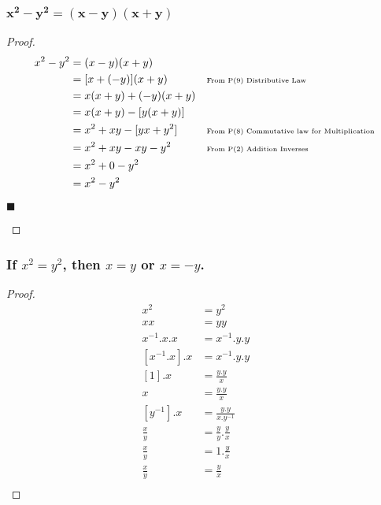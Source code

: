 \documentclass[letterpaper, 10 pt, conference]{ieeeconf}  %
\begin{document}
\subsubsection{$\boldsymbol{x^2 - y^2 = (x - y)(x + y)}$}

\begin{proof}
\begin{align}
     x^2 - y^2&= (x - y)(x + y) && \\
     &=[x + (-y)](x + y) && \text{\tiny{From P(9) Distributive Law}} \\ 
     &=x(x + y) + (-y)(x +y) &&\\
     &=x(x + y) - [y(x +y)] &&\\
     &=x^2 + xy - [yx + y^2] && \text{\tiny{From P(8) Commutative law for Multiplication}}\\
     &=x^2 + xy - xy - y^2 && \text{\tiny{From P(2) Addition Inverses}}\\
     &=x^2 + 0 - y^2 &&\\
     &=x^2 - y^2 &&
\end{align}
\begin{flushright}
$\blacksquare$
\end{flushright}
\end{proof}


\subsubsection{\textbf{If $x^2 = y^2$, then $x = y$ or $x = -y$.}}


\begin{proof}
\begin{align}
    x^2 &= y^2 && \\
    xx &= yy && \\
    x^{-1}.x.x &= x^{-1}.y.y &&\\
    [x^{-1}.x].x &= x^{-1}.y.y && \\
    [1].x & = \frac{y.y}{x} && \\
    x & = \frac{y.y}{x} && \\
    [y^{-1}].x & = \frac{y.y}{x.y^{-1}} && \\
    \frac{x}{y}& = \frac{y}{y} . \frac{y}{x} && \\
    \frac{x}{y}& = 1 . \frac{y}{x} && \\
    \frac{x}{y}& = \frac{y}{x} && \\
\end{align}
\end{proof}
\end{document}
